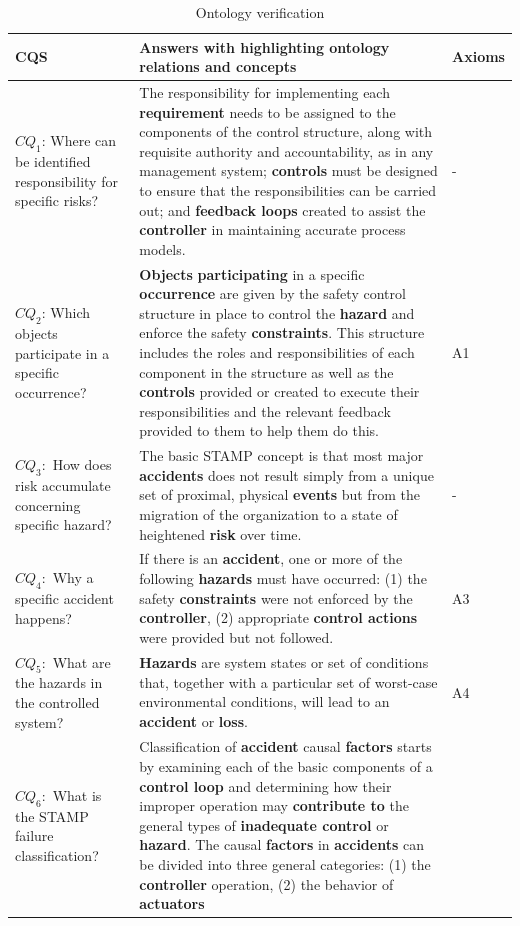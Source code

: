 \documentclass[sw]{iosart2x}
\begin{document}
\begin{table}\label{tab:my1}\caption{Ontology verification}
\begin{tabular}{|p{5cm}|p{8cm}|l|} 
    \hline
CQS& Answers with highlighting ontology relations and concepts & Axioms \\
\hline
$CQ_1$: Where can be identified responsibility for specific risks? &  The responsibility for implementing each \textbf{requirement} needs to be assigned to the components of the control structure, along with requisite authority and accountability, as in any management system; \textbf{controls} must be designed to ensure that the responsibilities can be carried out; and \textbf{feedback loops} created to assist the \textbf{controller} in maintaining accurate process models. & -\\
$CQ_2$: Which objects participate in a specific occurrence? & \textbf{Objects} \textbf{participating} in a specific \textbf{occurrence} are given by the safety control structure in place to control the \textbf{hazard} and enforce the safety \textbf{constraints}. This structure includes the roles and responsibilities of each component in the structure as well as the \textbf{controls} provided or created to execute their responsibilities and the relevant feedback provided to
them to help them do this. & A1 \\ 
$CQ_3:$ How does risk accumulate concerning specific hazard? & The basic STAMP concept is that most major \textbf{accidents} does not result simply from a unique set of proximal, physical \textbf{events} but from the migration of the organization to a state of heightened \textbf{risk} over time.  &  -\\
$CQ_4:$ Why a specific accident happens?& If there is an \textbf{accident}, one or more of the following \textbf{hazards} must have occurred: (1) the safety \textbf{constraints} were not enforced by the \textbf{controller}, (2) appropriate \textbf{control actions} were provided but not followed. & A3 \\
$CQ_5:$ What are the hazards in the controlled system? & \textbf{Hazards} are system states or set of conditions that, together with a particular set
of worst-case environmental conditions, will lead to an \textbf{accident} or \textbf{loss}.  & A4 \\ 
$CQ_6:$ What is the STAMP failure classification? & Classification of \textbf{accident} causal \textbf{factors} starts by examining each of the basic components of a \textbf{control loop} and determining how their improper operation may \textbf{contribute to} the general types of \textbf{inadequate control} or \textbf{hazard}. The causal \textbf{factors} in \textbf{accidents} can be divided into three general categories: (1) the \textbf{controller} operation, (2) the behavior of \textbf{actuators}

\end{tabular}
\end{table}
\end{document}
